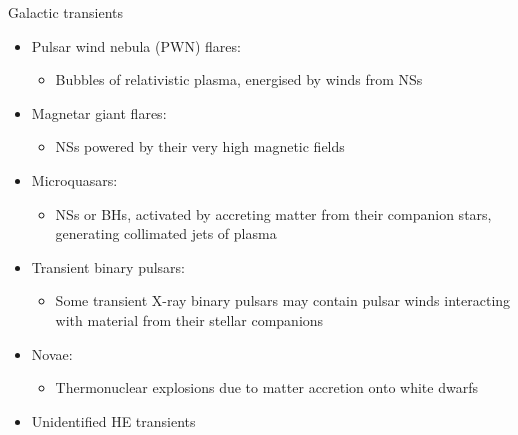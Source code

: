 \begin{frame}{Galactic transients}
  \begin{itemize}
    \item Pulsar wind nebula (PWN) flares:
    \begin{itemize}
      \item [\to] Bubbles of relativistic plasma, energised by winds from NSs
    \end{itemize}
    \item Magnetar giant flares:
    \begin{itemize}
      \item [\to] NSs powered by their very high magnetic fields
    \end{itemize}
    \item Microquasars:
    \begin{itemize}
      \item [\to] NSs or BHs, activated by accreting matter from their companion stars, generating collimated jets of plasma
    \end{itemize}
    \item Transient binary pulsars:
    \begin{itemize}
      \item [\to] Some transient X-ray binary pulsars may contain pulsar winds interacting with material from their stellar companions
    \end{itemize}
    \item Novae:
    \begin{itemize}
      \item [\to] Thermonuclear explosions due to matter accretion onto white dwarfs
    \end{itemize}
    \item Unidentified HE transients
  \end{itemize}
\end{frame}

